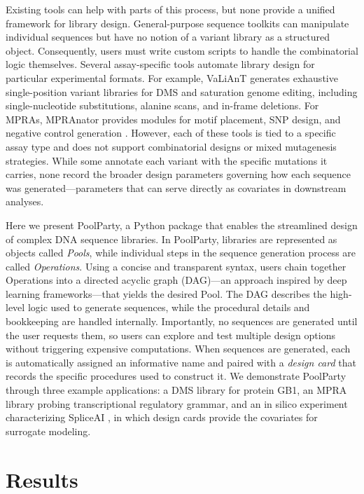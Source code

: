 \documentclass[twoside]{kinneylab_preprintstyle}
\begin{document}
Existing tools can help with parts of this process, but none provide a unified framework for library design. General-purpose sequence toolkits \citep{Cock2009df, Pereira2015wj, Klie2023kg} can manipulate individual sequences but have no notion of a variant library as a structured object. Consequently, users must write custom scripts to handle the combinatorial logic themselves. Several assay-specific tools automate library design for particular experimental formats. For example, VaLiAnT \citep{Barbon2022th} generates exhaustive single-position variant libraries for DMS and saturation genome editing, including single-nucleotide substitutions, alanine scans, and in-frame deletions. For MPRAs, MPRAnator \citep{GeorgakopoulosSoares2017gb} provides modules for motif placement, SNP design, and negative control generation \citep[see also][]{Ghazi2018aa}. However, each of these tools is tied to a specific assay type and does not support combinatorial designs or mixed mutagenesis strategies. While some annotate each variant with the specific mutations it carries, none record the broader design parameters governing how each sequence was generated---parameters that can serve directly as covariates in downstream analyses. 

Here we present PoolParty, a Python package that enables the streamlined design of complex DNA sequence libraries. In PoolParty, libraries are represented as objects called \emph{Pools}, while individual steps in the sequence generation process are called \emph{Operations}. Using a concise and transparent syntax, users chain together Operations into a directed acyclic graph (DAG)---an approach inspired by deep learning frameworks---that yields the desired Pool. The DAG describes the high-level logic used to generate sequences, while the procedural details and bookkeeping are handled internally. Importantly, no sequences are generated until the user requests them, so users can explore and test multiple design options without triggering expensive computations. When sequences are generated, each is automatically assigned an informative name and paired with a \emph{design card} that records the specific procedures used to construct it. We demonstrate PoolParty through three example applications: a DMS library for protein GB1, an MPRA library probing transcriptional regulatory grammar, and an in silico experiment characterizing SpliceAI \citep{Jaganathan2019ps}, in which design cards provide the covariates for surrogate modeling.

\section*{Results}
\end{document}
